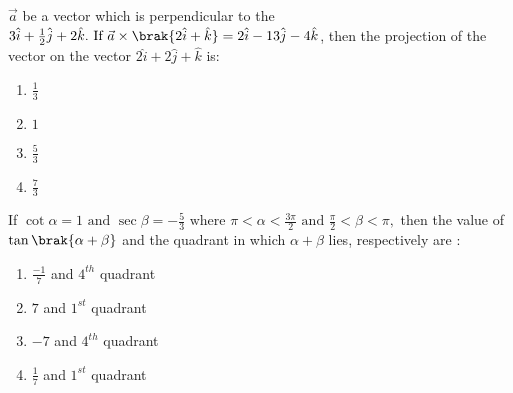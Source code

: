 \item   
 $\vec{a}$ be a vector which is perpendicular to the  $3\hat{i} + \frac{1}{2}\hat{j} + 2\hat{k}.  \text{ If }  \vec{a} \times \brak{2\hat{i} + \hat{k}} = 2\hat{i} - 13\hat{j} - 4\hat{k}$, then the projection of the vector on the vector
$2\hat{i} + 2\hat{j} + \hat{k} $ is: 

\hfill{}


\begin{multicols}{4}
\begin{enumerate}
\item $\frac{1}{3}$
\item $1$
\item $\frac{5}{3}$
\item $\frac{7}{3}$
\end{enumerate}
\end{multicols}

\item  If
$\cot{\alpha} = 1   \text{ and }   \sec{\beta} = -\frac{5}{3} \text{ where }   \pi < \alpha < \frac{3\pi}{2}   \text{ and }   \frac{\pi}{2} < \beta < \pi,$ then the value of $\tan \brak{\alpha + \beta}$ and the quadrant in which $\alpha + \beta$ lies, respectively are :

\hfill{}


\begin{multicols}{2}
\begin{enumerate}
\item $\frac{-1}{7} $ and $4^{th}$ quadrant
\item $7 $ and $1^{st}$ quadrant
\item $-7$ and $4^{th}$ quadrant
\item $\frac{1}{7} $ and $1^{st}$ quadrant
\end{enumerate}
\end{multicols}

